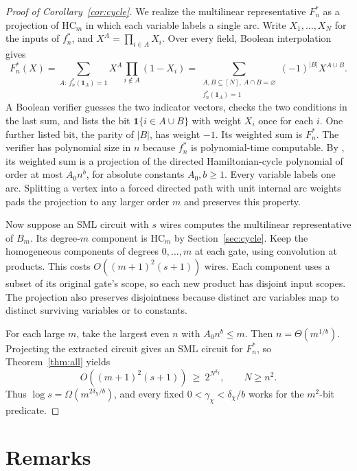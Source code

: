 \documentclass[11pt]{article}
\theoremstyle{remark}
\newcommand{\HC}{\mathrm{HC}}
\newcommand{\one}{\mathbf 1}
\begin{document}
\begin{proof}[Proof of Corollary~\ref{cor:cycle}]
We realize the multilinear representative \(F_n^*\) as a projection of
\(\HC_m\) in which each variable labels a single arc. Write
\(X_1,\ldots,X_N\) for the inputs of \(f_n^*\), and \(X^A=\prod_{i\in A}X_i\).
Over every field, Boolean interpolation gives
\[
 F_n^*(X)
 =\sum_{A:\,f_n^*(\one_A)=1} X^A\prod_{i\notin A}(1-X_i)
 =\sum_{\substack{A,B\subseteq[N],\ A\cap B=\varnothing\\
                   f_n^*(\one_A)=1}}(-1)^{|B|} X^{A\cup B}.
\]
A Boolean verifier guesses the two indicator vectors, checks the two
conditions in the last sum, and lists the bit \(\one\{i\in A\cup B\}\)
with weight \(X_i\) once for each \(i\). One further listed bit, the
parity of \(|B|\), has weight \(-1\). Its weighted sum is \(F_n^*\).
The verifier has polynomial size in \(n\) because \(f_n^*\) is
polynomial-time computable. By \cite[Lemma 3.4]{hc}, its weighted sum
is a projection of the directed Hamiltonian-cycle polynomial of order
at most \(A_0n^b\), for absolute constants \(A_0,b\ge1\). Every
variable labels one arc. Splitting a vertex into a forced directed
path with unit internal arc weights pads the projection to any larger
order \(m\) and preserves this property.

Now suppose an SML circuit with \(s\) wires computes the multilinear
representative of \(B_m\). Its degree-\(m\) component is \(\HC_m\) by
Section~\ref{sec:cycle}. Keep the homogeneous components of degrees
\(0,\ldots,m\) at each gate, using convolution at products. This costs
\(O((m+1)^2(s+1))\) wires. Each component uses a subset of its original
gate's scope, so each new product has disjoint input scopes. The
projection also preserves disjointness because distinct arc variables
map to distinct surviving variables or to constants.

For each large \(m\), take the largest even \(n\) with \(A_0n^b\le m\).
Then \(n=\Theta(m^{1/b})\). Projecting the extracted circuit gives an
SML circuit for \(F_n^*\), so Theorem~\ref{thm:all} yields
\[
 O((m+1)^2(s+1))\ \ge\ 2^{N^{\delta_\chi}},
 \qquad N\ge n^2 .
\]
Thus \(\log s=\Omega(m^{2\delta_\chi/b})\), and every fixed
\(0<\gamma_\chi<\delta_\chi/b\) works for the \(m^2\)-bit predicate.
\end{proof}

\section{Remarks}\label{sec:status}
\end{document}
